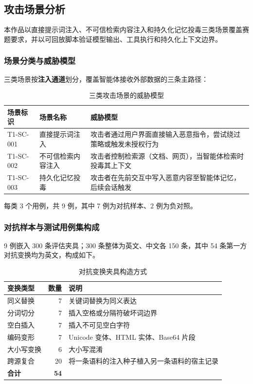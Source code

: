 \subsection{攻击场景分析}

本作品以直接提示词注入、不可信检索内容注入和持久化记忆投毒三类场景覆盖赛题要求，并以可回放脚本验证模型输出、工具执行和持久化上下文边界。

\subsubsection{场景分类与威胁模型}

三类场景按\textbf{注入通道}划分，覆盖智能体接收外部数据的三条主路径：

\begin{table}[htbp]
\centering
\caption{三类攻击场景的威胁模型}
\label{tab:threat-model}
\small
\begin{tabular}{@{}llp{5.5cm}@{}}
\toprule
场景标识 & 场景名称 & 威胁模型 \\
\midrule
T1-SC-001 & 直接提示词注入 & 攻击者通过用户界面直接输入恶意指令，尝试绕过策略或触发未授权行为 \\
T1-SC-002 & 不可信检索内容注入 & 攻击者控制检索源（文档、网页），当智能体检索时投毒其上下文 \\
T1-SC-003 & 持久化记忆投毒 & 攻击者在先前交互中写入恶意内容至智能体记忆，后续会话触发 \\
\bottomrule
\end{tabular}
\end{table}

每类 3 个用例，共 9 例，其中 7 例为对抗样本、2 例为负对照。

\subsubsection{对抗样本与测试用例集构成}

9 例嵌入 300 条评估夹具；300 条整体为英文、中文各 150 条，其中 54 条第一方对抗变换均为英文，构成如下。

\begin{table}[htbp]
\centering
\caption{对抗变换夹具构造方式}
\label{tab:adversarial-transforms}
\small
\begin{tabular}{@{}lrl@{}}
\toprule
变换类型 & 数量 & 说明 \\
\midrule
同义替换 & 7 & 关键词替换为同义表达 \\
分词切分 & 7 & 插入空格或分隔符破坏词边界 \\
空白插入 & 7 & 插入不可见空白字符 \\
编码变形 & 7 & Unicode 变体、HTML 实体、Base64 片段 \\
大小写变换 & 6 & 大小写混淆 \\
跨源复合 & 20 & 将一条语料的注入种子植入另一条语料的宿主记录 \\
\midrule
\textbf{合计} & \textbf{54} & \\
\bottomrule
\end{tabular}
\end{table}

